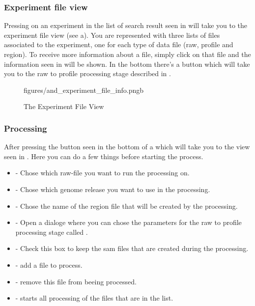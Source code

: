 \subsubsection{Experiment file view}\label{sec:and_experiment_file}
Pressing on an experiment in the list of search result seen in  will take you to the experiment file view (see a). You are represented with three lists of files associated to the experiment, one for each type of data file (raw, profile and region). To receive more information about a file, simply click on that file and the information seen in  will be shown. In the bottom there's a button  which will take you to the raw to profile processing stage described in .

\begin{figure}[h]
		{figures/and_experiment_file_info.png}{b}
\caption{The Experiment File View}
\label{fig:and_experiment_man}
\end{figure}
\FloatBarrier


\subsubsection{Processing}\label{sec:and_processing}
After pressing the  button seen in the bottom of a which will take you to the view seen in . Here you can do a few things before starting the process.
\begin{itemize}
\item {} - Chose which raw-file you want to run the processing on.
\item {} - Chose which genome release you want to use in the processing.
\item {} - Chose the name of the region file that will be created by the processing.
\item {} - Open a dialoge where you can chose the parameters for the raw to profile processing stage called .
\item {} - Check this box to keep the sam files that are created during the processing.
\item {} - add a file to process.
\item {} - remove this file from beeing processed.
\item {} - starts all processing of the files that are in the list.
\end{itemize}



